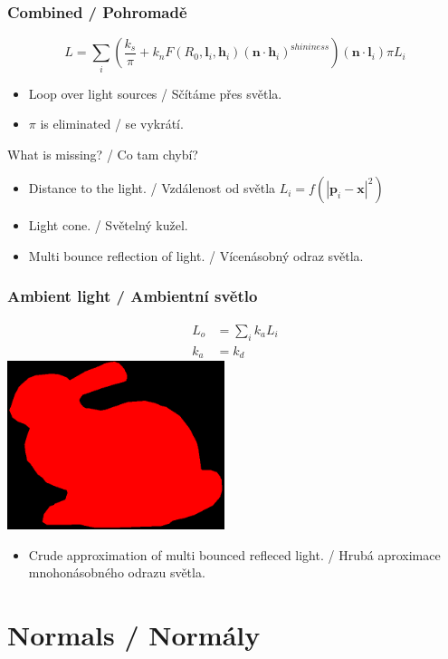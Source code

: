 \begin{frame}\frametitle{Combined / Pohromadě}
    \begin{equation*}
        L = \sum_i \left(\frac{k_s}{\pi} + k_n F(R_0, \mathbf l_i,\mathbf h_i)(\mathbf n \cdot \mathbf h_i)^{\mathrm shininess}\right)(\mathbf n \cdot \mathbf l_i) \pi L_i
    \end{equation*}
    \begin{itemize}
        \item Loop over light sources / Sčítáme přes světla.
        \item $\pi$ is eliminated / se vykrátí.
    \end{itemize}
    \pause
    \vfill
    What is missing? / Co tam chybí?
    \pause
    \begin{itemize}
        \item Distance to the light. / Vzdálenost od světla $L_i = f(|\mathbf p_i - \mathbf x|^2)$
        \item Light cone. / Světelný kužel.
        \item Multi bounce reflection of light. / Vícenásobný odraz světla.
    \end{itemize}
\end{frame}

\begin{frame}\frametitle{Ambient light / Ambientní světlo}
    \begin{align*}
        L_o &= \sum_i k_a L_i \\
        k_a &= k_d 
    \end{align*}
    \vfill
    \includegraphics[width=2.5in]{pics/physicallyBasedRendering/ambient}
    \begin{itemize}
        \item Crude approximation of multi bounced refleced light. / Hrubá aproximace mnohonásobného odrazu světla.
    \end{itemize}
\end{frame}

\section{Normals / Normály}

